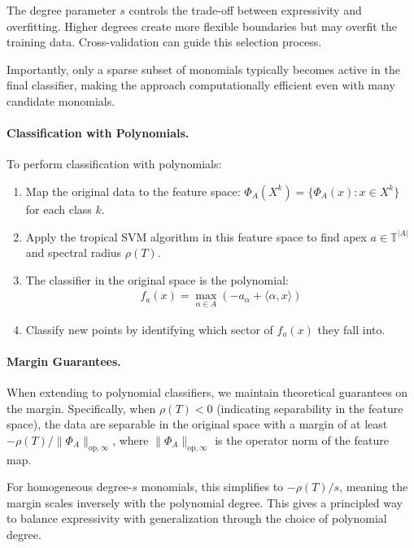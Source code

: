 \documentclass{article}
\newcommand{\trop}{\mathbb{T}}
\begin{document}
The degree parameter $s$ controls the trade-off between expressivity and overfitting. Higher degrees create more flexible boundaries but may overfit the training data. Cross-validation can guide this selection process.

Importantly, only a sparse subset of monomials typically becomes active in the final classifier, making the approach computationally efficient even with many candidate monomials.

\paragraph{Classification with Polynomials.}\label{subsec:poly_classification}
To perform classification with polynomials:

\begin{enumerate}
    \item Map the original data to the feature space: $\Phi_A(X^k) = \{\Phi_A(x) : x \in X^k\}$ for each class $k$.
    
    \item Apply the tropical SVM algorithm in this feature space to find apex $a \in \trop^{|A|}$ and spectral radius $\rho(T)$.
    
    \item The classifier in the original space is the polynomial:
    \begin{align}
    f_a(x) = \max_{\alpha \in A} (-a_\alpha + \langle \alpha, x \rangle)
    \end{align}
    
    \item Classify new points by identifying which sector of $f_a(x)$ they fall into.
\end{enumerate}

\paragraph{Margin Guarantees.}
When extending to polynomial classifiers, we maintain theoretical guarantees on the margin. Specifically, when $\rho(T)<0$ (indicating separability in the feature space), the data are separable in the original space with a margin of at least $-\rho(T)/\lVert \Phi_A\rVert_{\text{op},\infty}$, where $\lVert \Phi_A\rVert_{\text{op},\infty}$ is the operator norm of the feature map.

For homogeneous degree-$s$ monomials, this simplifies to $-\rho(T)/s$, meaning the margin scales inversely with the polynomial degree. This gives a principled way to balance expressivity with generalization through the choice of polynomial degree.
\end{document}
